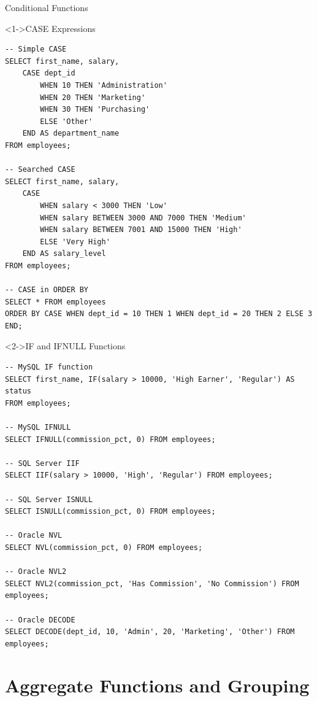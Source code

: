\documentclass[aspectratio=169,11pt]{beamer}
\begin{document}
\begin{frame}[fragile]{Conditional Functions}
\begin{exampleblock}<1->{CASE Expressions}
\begin{lstlisting}
-- Simple CASE
SELECT first_name, salary,
    CASE dept_id
        WHEN 10 THEN 'Administration'
        WHEN 20 THEN 'Marketing'
        WHEN 30 THEN 'Purchasing'
        ELSE 'Other'
    END AS department_name
FROM employees;

-- Searched CASE
SELECT first_name, salary,
    CASE 
        WHEN salary < 3000 THEN 'Low'
        WHEN salary BETWEEN 3000 AND 7000 THEN 'Medium'
        WHEN salary BETWEEN 7001 AND 15000 THEN 'High'
        ELSE 'Very High'
    END AS salary_level
FROM employees;

-- CASE in ORDER BY
SELECT * FROM employees
ORDER BY CASE WHEN dept_id = 10 THEN 1 WHEN dept_id = 20 THEN 2 ELSE 3 END;
\end{lstlisting}
\end{exampleblock}

\pause
\begin{exampleblock}<2->{IF and IFNULL Functions}
\begin{lstlisting}
-- MySQL IF function
SELECT first_name, IF(salary > 10000, 'High Earner', 'Regular') AS status
FROM employees;

-- MySQL IFNULL
SELECT IFNULL(commission_pct, 0) FROM employees;

-- SQL Server IIF
SELECT IIF(salary > 10000, 'High', 'Regular') FROM employees;

-- SQL Server ISNULL
SELECT ISNULL(commission_pct, 0) FROM employees;

-- Oracle NVL
SELECT NVL(commission_pct, 0) FROM employees;

-- Oracle NVL2
SELECT NVL2(commission_pct, 'Has Commission', 'No Commission') FROM employees;

-- Oracle DECODE
SELECT DECODE(dept_id, 10, 'Admin', 20, 'Marketing', 'Other') FROM employees;
\end{lstlisting}
\end{exampleblock}
\end{frame}

\section{Aggregate Functions and Grouping}
\end{document}
